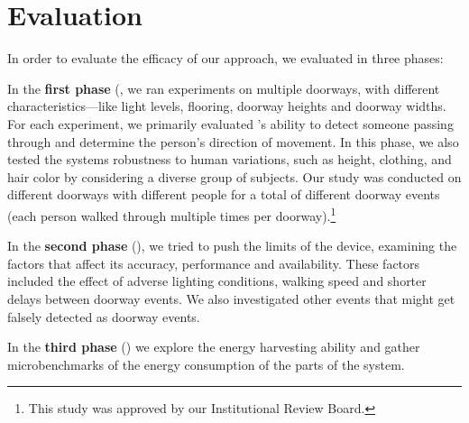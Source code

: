 \section{Evaluation}
\label{sec:evaluation}
In order to evaluate the efficacy of our approach, we evaluated \sysname in three phases:

In the \textbf{first phase} (, we ran experiments on multiple doorways, with different characteristics---like light levels, flooring, doorway heights and doorway widths.
For each experiment, we primarily evaluated \sysname's ability to detect someone passing through and determine the person's direction of movement.
In this phase, we also tested the systems robustness to human variations, such as height, clothing, and hair color by considering a diverse group of subjects.
Our study was conducted on \numDoors different doorways with \numPeople different people for a total of \numExp different doorway events (each person walked through multiple times per doorway).\footnote{This study was approved by our Institutional Review Board.}

In the \textbf{second phase} (), we tried to push the limits of the device, examining the factors that affect its accuracy, performance and availability.
These factors included the effect of adverse lighting conditions, walking speed and shorter delays between doorway events.
We also investigated other events that might get falsely detected as doorway events.

In the \textbf{third phase} () we explore the energy harvesting ability and gather microbenchmarks of the energy consumption of the parts of the \sysname system.

